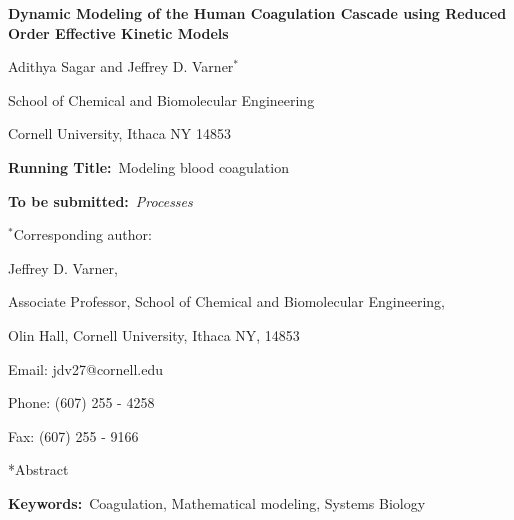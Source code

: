 \documentclass[12pt]{article}
\makeatletter
\renewcommand\section{\@startsection
	{subsection}{2}{0mm}
	{-0.2in}
	{0.05\baselineskip}
	{\normalfont\large\bfseries}}
\makeatother
\begin{document}
\begin{titlepage}
{\par\centering\textbf{\Large Dynamic Modeling of the Human Coagulation Cascade using Reduced Order Effective Kinetic Models}}
\vspace{0.05in}
{\par \centering \large{Adithya Sagar and Jeffrey D. Varner$^{*}$}}
\vspace{0.10in}
{\par \centering \large{School of Chemical and Biomolecular Engineering}}
{\par \centering \large{Cornell University, Ithaca NY 14853}}
\vspace{0.1in}
{\par \centering \textbf{Running Title:}~Modeling blood coagulation}
\vspace{0.1in}
{\par \centering \textbf{To be submitted:}~\emph{Processes}}
\vspace{0.5in}
{\par \centering $^{*}$Corresponding author:}
{\par \centering Jeffrey D. Varner,}
{\par \centering Associate Professor, School of Chemical and Biomolecular Engineering,}
{\par {} Olin Hall, Cornell University, Ithaca NY, 14853} 
{\par \centering Email: jdv27@cornell.edu} 
{\par \centering Phone: (607) 255 - 4258}
{\par \centering Fax: (607) 255 - 9166}
\end{titlepage}
\date{}
\thispagestyle{empty}
\pagebreak
\section*{Abstract}

{\noindent \textbf{Keywords:}~Coagulation, Mathematical modeling, Systems Biology}

\pagebreak

\setcounter{page}{1}

\linenumbers
\end{document}
